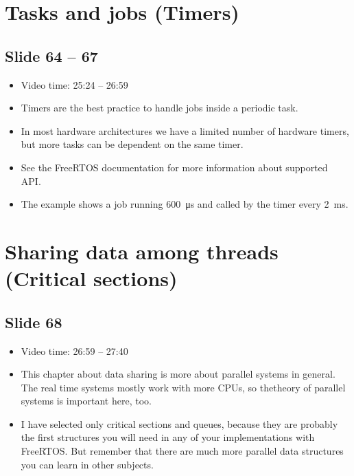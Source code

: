 \documentclass[12pt, a4paper]{article}
\begin{document}
	\section{Tasks and jobs (Timers)}
	\subsection{Slide 64 -- 67}
	\begin{itemize}
		\item Video time: 25:24 -- 26:59
		\item Timers are the best practice to handle jobs inside a periodic task.
		\item In most hardware architectures we have a limited number of hardware timers, but more tasks can be dependent on the same timer.
		\item See the FreeRTOS documentation for more information about supported API.
		\item The example shows a job running \SI{600}{\micro \second} and called by the timer every \SI{2}{ms}.
	\end{itemize}

	\section{Sharing data among threads (Critical sections)}
	\subsection{Slide 68}
	\begin{itemize}
		\item Video time: 26:59 -- 27:40
		\item This chapter about data sharing is more about parallel systems in general. The real time systems mostly work with more CPUs, so thetheory of parallel systems is important here, too.
		\item I have selected only critical sections and queues, because they are probably the first structures you will need in any of your implementations with FreeRTOS. But remember that there are much more parallel data structures you can learn in other subjects.
	\end{itemize}
\end{document}
